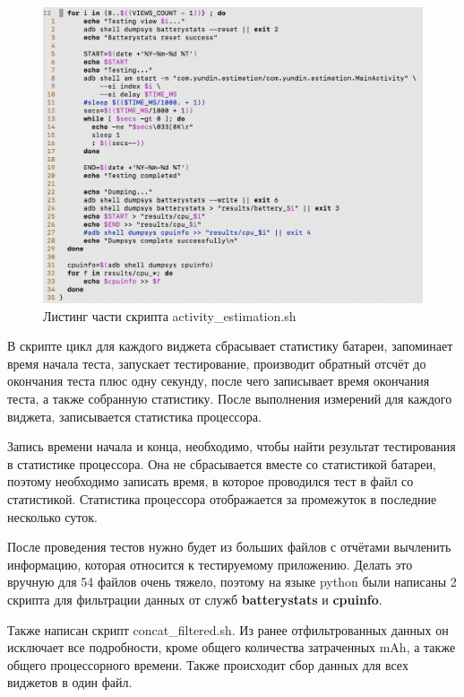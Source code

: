 \documentclass[a4paper,14pt]{extarticle} %
\begin{document}
	\begin{figure}[tbh]
		\includegraphics[width=\textwidth]{activity_estimation}
		\caption{Листинг части скрипта activity\_estimation.sh}
		\label{fig:activity_estimation}
	\end{figure}

	В скрипте цикл для каждого виджета сбрасывает статистику батареи, запоминает время начала теста, запускает тестирование, производит обратный отсчёт до окончания теста плюс одну секунду, после чего записывает время окончания теста, а также собранную статистику. После выполнения измерений для каждого виджета, записывается статистика процессора.
	
	Запись времени начала и конца, необходимо, чтобы найти результат тестирования в статистике процессора. Она не сбрасывается вместе со статистикой батареи, поэтому необходимо записать время, в которое проводился тест в файл со статистикой. Статистика процессора отображается за промежуток в последние несколько суток.
	
	После проведения тестов нужно будет из больших файлов с отчётами вычленить информацию, которая относится к тестируемому приложению. Делать это вручную для 54 файлов очень тяжело, поэтому на языке python были написаны 2 скрипта для фильтрации данных от служб \textbf{batterystats} и \textbf{cpuinfo}.
	
	Также написан скрипт concat\_filtered.sh. Из ранее отфильтрованных данных он исключает все подробности, кроме общего количества затраченных mAh, а также общего процессорного времени. Также происходит сбор данных для всех виджетов в один файл.
	
\end{document}
